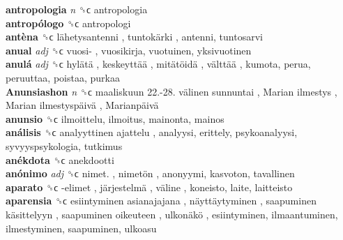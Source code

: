 \textbf{antropologia} \emph{n}  ␝ϲ  antropologia  \\
\textbf{antropólogo} ␝ϲ  antropologi  \\
\textbf{antèna} ␝ϲ   lähetysantenni ,  tuntokärki , antenni, tuntosarvi  \\
\textbf{anual} \emph{adj}  ␝ϲ   vuosi- , vuosikirja, vuotuinen, yksivuotinen  \\
\textbf{anulá} \emph{adj}  ␝ϲ   hylätä ,  keskeyttää ,  mitätöidä ,  välttää , kumota, perua, peruuttaa, poistaa, purkaa  \\
\textbf{Anunsiashon} \emph{n}  ␝ϲ   maaliskuun 22.-28. välinen sunnuntai ,  Marian ilmestys ,  Marian ilmestyspäivä ,  Marianpäivä   \\
\textbf{anunsio} ␝ϲ  ilmoittelu, ilmoitus, mainonta, mainos  \\
\textbf{análisis} ␝ϲ   analyyttinen ajattelu , analyysi, erittely, psykoanalyysi, syvyyspsykologia, tutkimus  \\
\textbf{anékdota} ␝ϲ  anekdootti  \\
\textbf{anónimo} \emph{adj}  ␝ϲ   nimet. ,  nimetön , anonyymi, kasvoton, tavallinen  \\
\textbf{aparato} ␝ϲ   -elimet ,  järjestelmä ,  väline , koneisto, laite, laitteisto  \\
\textbf{aparensia} ␝ϲ   esiintyminen asianajajana ,  näyttäytyminen ,  saapuminen käsittelyyn ,  saapuminen oikeuteen ,  ulkonäkö , esiintyminen, ilmaantuminen, ilmestyminen, saapuminen, ulkoasu  \\

